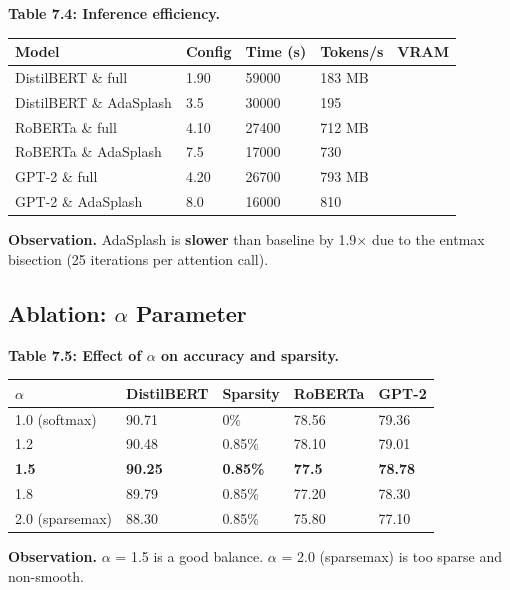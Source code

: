 \textbf{Table 7.4: Inference efficiency.}

\begin{table}[H]
\centering
\small
\begin{tabular}{lllll}
\toprule
\textbf{Model} & \textbf{Config} & \textbf{Time (s)} & \textbf{Tokens/s} & \textbf{VRAM} \\
\midrule
DistilBERT \& full & 1.90 & 59000 & 183 MB \\
DistilBERT \& AdaSplash & 3.5 & 30000 & 195 \\
RoBERTa \& full & 4.10 & 27400 & 712 MB \\
RoBERTa \& AdaSplash & 7.5 & 17000 & 730 \\
GPT-2 \& full & 4.20 & 26700 & 793 MB \\
GPT-2 \& AdaSplash & 8.0 & 16000 & 810 \\
\bottomrule
\end{tabular}
\end{table}

\textbf{Observation.} AdaSplash is \textbf{slower} than baseline by 1.9$\times$ 
due to the entmax bisection (25 iterations per attention call).

\subsection{Ablation: $\alpha$ Parameter}

\textbf{Table 7.5: Effect of $\alpha$ on accuracy and sparsity.}

\begin{table}[H]
\centering
\small
\begin{tabular}{lllll}
\toprule
\textbf{$\alpha$} & \textbf{DistilBERT} & \textbf{Sparsity} & \textbf{RoBERTa} & \textbf{GPT-2} \\
\midrule
1.0 (softmax) & 90.71 & 0\% & 78.56 & 79.36 \\
1.2 & 90.48 & 0.85\% & 78.10 & 79.01 \\
\textbf{1.5} & \textbf{90.25} & \textbf{0.85\%} & \textbf{77.5} & \textbf{78.78} \\
1.8 & 89.79 & 0.85\% & 77.20 & 78.30 \\
2.0 (sparsemax) & 88.30 & 0.85\% & 75.80 & 77.10 \\
\bottomrule
\end{tabular}
\end{table}

\textbf{Observation.} $\alpha$ = 1.5 is a good balance. $\alpha$ = 2.0 (sparsemax) is too sparse 
and non-smooth.

